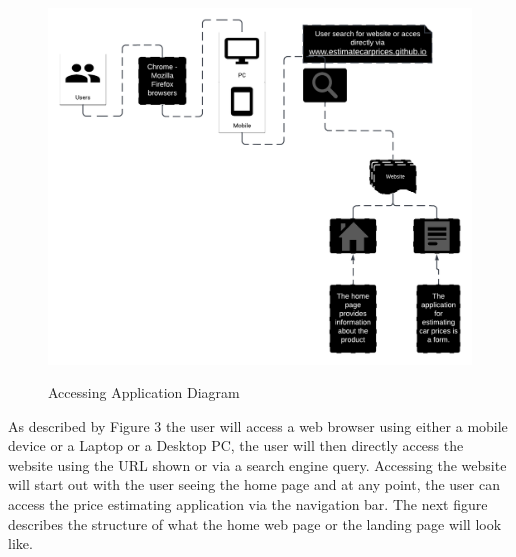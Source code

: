 \documentclass[12pt]{article}
\begin{document}
\begin{figure}[H]
\caption{Accessing Application Diagram}
\centering
\includegraphics[scale=.3]{figures/Accessing Application Flowchart.png}\\
\end{figure}
\noindent As described by Figure 3 the user will access a web browser using either a mobile device or a Laptop or a Desktop PC, the user will then directly access the website using the URL shown or via a search engine query. Accessing the website will start out with the user seeing the home page and at any point, the user can access the price estimating application via the navigation bar. The next figure describes the structure of what the home web page or the landing page will look like.
\end{document}
